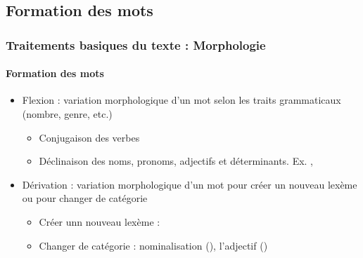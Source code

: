 \documentclass[xcolor=table]{beamer}
\begin{document}
\subsection{Formation des mots}

\begin{frame}
\frametitle{Traitements basiques du texte : Morphologie}
\framesubtitle{Formation des mots}

\begin{itemize}
	\item Flexion : variation morphologique d'un mot selon les traits grammaticaux (nombre, genre, etc.)
	\begin{itemize}
		\item Conjugaison des verbes 
		\item Déclinaison des noms, pronoms, adjectifs et déterminants. 
		Ex.  \textrightarrow {}, 
	\end{itemize}
	\item Dérivation : variation morphologique d'un mot pour créer un nouveau lexème ou pour changer de catégorie
	\begin{itemize}
		\item Créer unn nouveau lexème : 
		\item Changer de catégorie : nominalisation (), l'adjectif ()
	\end{itemize}
\end{itemize}

\end{frame}
\end{document}
